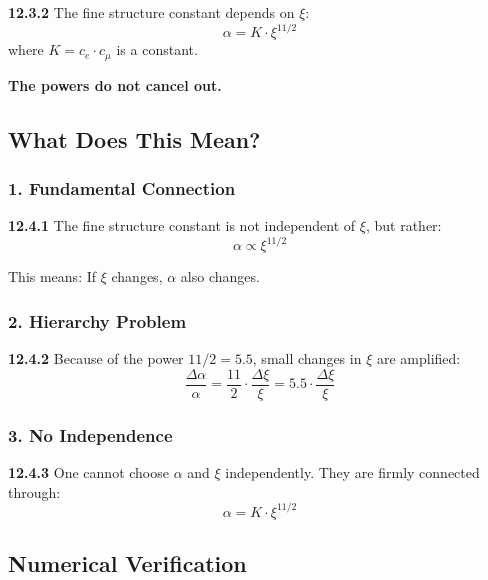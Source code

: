 \begin{tcolorbox}[colback=red!5!white,colframe=red!75!black,title=\textbf{Result}]
	\noindent \textbf{12.3.2} The fine structure constant depends on $\xi$:
	\begin{equation}
		\boxed{\alpha = K \cdot \xi^{11/2}}
	\end{equation}
	where $K = c_e \cdot c_\mu$ is a constant.
	
	\textbf{The powers do not cancel out.}
\end{tcolorbox}

\subsection{What Does This Mean?}

\subsubsection{1. Fundamental Connection}
\noindent \textbf{12.4.1} The fine structure constant is not independent of $\xi$, but rather:
\begin{equation}
	\alpha \propto \xi^{11/2}
\end{equation}

This means: If $\xi$ changes, $\alpha$ also changes.

\subsubsection{2. Hierarchy Problem}
\noindent \textbf{12.4.2} Because of the power $11/2 = 5.5$, small changes in $\xi$ are amplified:
\begin{equation}
	\frac{\Delta \alpha}{\alpha} = \frac{11}{2} \cdot \frac{\Delta \xi}{\xi} = 5.5 \cdot \frac{\Delta \xi}{\xi}
\end{equation}

\subsubsection{3. No Independence}
\noindent \textbf{12.4.3} One cannot choose $\alpha$ and $\xi$ independently. They are firmly connected through:
\begin{equation}
	\alpha = K \cdot \xi^{11/2}
\end{equation}

\subsection{Numerical Verification}

